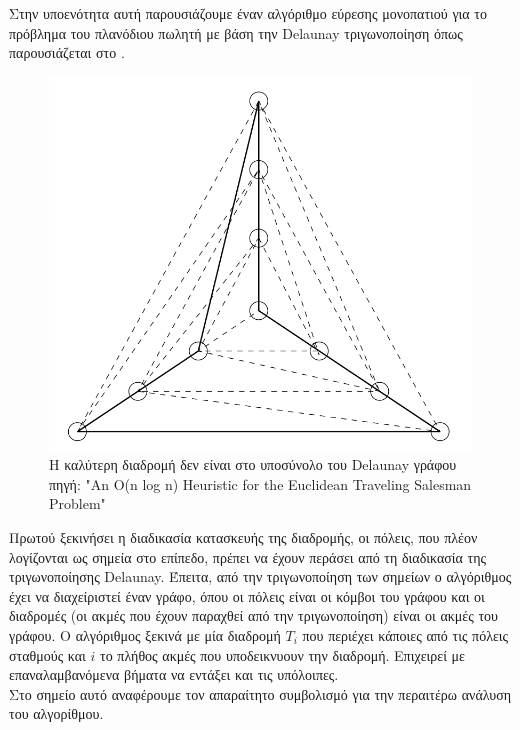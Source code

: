 \documentclass[oneside,12pt]{book}
\newenvironment{matlab}
	{\begin{figure}[hp]\centering\captionsetup{justification=centering}}
	{\end{figure}}
\theoremstyle{definition}
\begin{document}
Στην υποενότητα αυτή παρουσιάζουμε έναν αλγόριθμο εύρεσης μονοπατιού για το πρόβλημα του πλανόδιου πωλητή με βάση την Delaunay τριγωνοποίηση όπως παρουσιάζεται στο \cite{10}. \\

\begin{matlab}
	\includegraphics[scale=0.5]{images/delaunay_optimum_tour.png}
	\caption{Η καλύτερη διαδρομή δεν είναι στο υποσύνολο του Delaunay γράφου \\ πηγή: "An O(n log n) Heuristic for the Euclidean Traveling Salesman Problem" \cite{10} }
\end{matlab} 

Πρωτού ξεκινήσει η διαδικασία κατασκευής της διαδρομής, οι πόλεις, που πλέον λογίζονται ως σημεία στο επίπεδο, πρέπει να έχουν περάσει από τη διαδικασία της τριγωνοποίησης Delaunay. Έπειτα, από την τριγωνοποίηση των σημείων ο αλγόριθμος έχει να διαχείριστεί έναν γράφο, όπου οι πόλεις είναι οι κόμβοι του γράφου και οι διαδρομές (οι ακμές που έχουν παραχθεί από την τριγωνοποίηση) είναι οι ακμές του γράφου. Ο αλγόριθμος ξεκινά με μία διαδρομή \(T_i\) που περιέχει κάποιες από τις πόλεις σταθμούς και \(i\) το πλήθος ακμές που υποδεικνυουν την διαδρομή. Επιχειρεί με επαναλαμβανόμενα βήματα να εντάξει και τις υπόλοιπες. \\

Στο σημείο αυτό αναφέρουμε τον απαραίτητο συμβολισμό για την περαιτέρω ανάλυση του αλγορίθμου. \\
\end{document}
